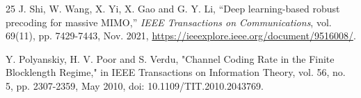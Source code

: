 \documentclass[a4paper, 12pt, onecolumn, journal, twoside, draftclsnofoot]{IEEEtran}
\begin{document}
\begin{thebibliography}{25}
J. Shi, W. Wang, X. Yi, X. Gao and G. Y. Li, ``Deep learning-based robust precoding for massive MIMO,'' \emph{IEEE Transactions on Communications}, vol. 69(11), pp. 7429-7443, Nov. 2021, \href{https://ieeexplore.ieee.org/document/9516008/}{https://ieeexplore.ieee.org/document/9516008/}.

Y. Polyanskiy, H. V. Poor and S. Verdu, "Channel Coding Rate in the Finite Blocklength Regime," in IEEE Transactions on Information Theory, vol. 56, no. 5, pp. 2307-2359, May 2010, doi: 10.1109/TIT.2010.2043769.



\end{thebibliography}
\end{document}
